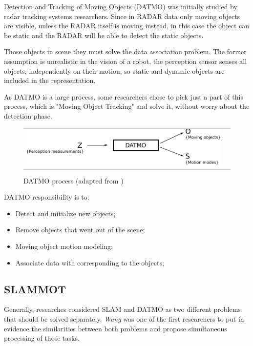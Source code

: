 Detection and Tracking of Moving Objects (DATMO) was initially studied by radar tracking systems \cite{VU-2009-454238} researchers. Since in RADAR data only moving objects are visible, unless the RADAR itself is moving instead, in this case the object can be static and the RADAR will be able to detect the static objects.

Those objects in scene they must solve the data association problem. The former assumption is unrealistic in the vision of a robot, the perception sensor senses all objects, independently on their motion, so static and dynamic objects are included in the representation.

As DATMO is a large process, some researchers chose to pick just a part of this process, which is "Moving Object Tracking" and solve it, without worry about the detection phase.

\begin{figure}[h]
   \centering
     \begin{tabular}{lr}
       \includegraphics[scale=1.0]{img/fig:datmo:process}
     \end{tabular}
   \caption{DATMO process (adapted from \cite{Wang04a})}
   \label{fig:datmo:process}
 \end{figure}

DATMO responsibility is to:

\begin{itemize}
\item Detect and initialize new objects;
\item Remove objects that went out of the scene;
\item Moving object motion modeling;
\item Associate data with corresponding to the objects;
\end{itemize}

\subsection{SLAMMOT}

Generally, researches considered SLAM and DATMO as two different problems that should be solved separately. \textit{Wang} was one of the first researchers to put in evidence the similarities between both problems and propose simultaneous processing of those tasks\cite{Wang03onlinesimultaneous}.

